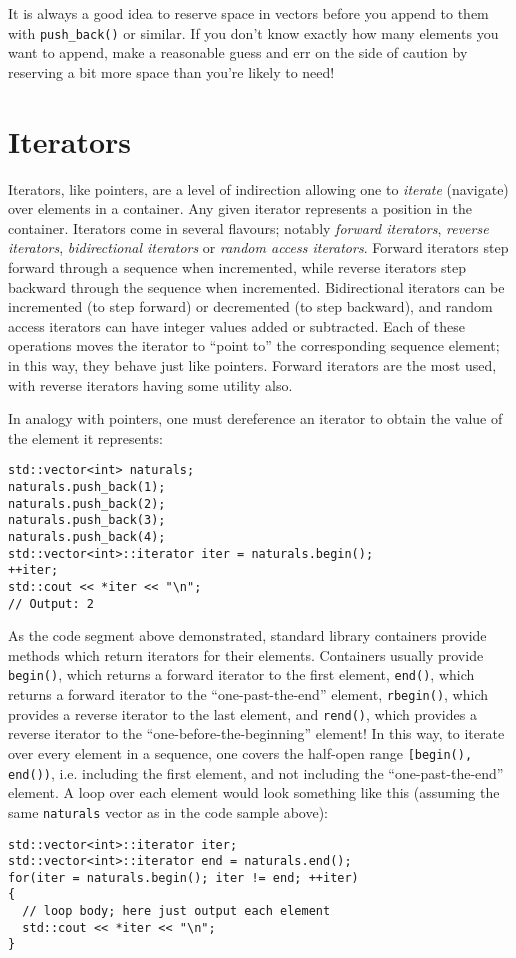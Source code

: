 \documentclass[a4paper]{scrartcl}
\begin{document}
It is always a good idea to reserve space in vectors before you append to them with \verb|push_back()| or similar. If you don't know exactly how many elements you want to append, make a reasonable guess and err on the side of caution by reserving a bit more space than you're likely to need!

\section{Iterators}\label{sec:iter}
Iterators, like pointers, are a level of indirection allowing one to \emph{iterate} (navigate) over elements in a container. Any given iterator represents a position in the container. Iterators come in several flavours; notably \emph{forward iterators}, \emph{reverse iterators}, \emph{bidirectional iterators} or \emph{random access iterators}. Forward iterators step forward through a sequence when incremented, while reverse iterators step backward through the sequence when incremented. Bidirectional iterators can be incremented (to step forward) or decremented (to step backward), and random access iterators can have integer values added or subtracted. Each of these operations moves the iterator to ``point to'' the corresponding sequence element; in this way, they behave just like pointers. Forward iterators are the most used, with reverse iterators having some utility also.

In analogy with pointers, one must dereference an iterator to obtain the value of the element it represents:
\begin{verbatim}
std::vector<int> naturals;
naturals.push_back(1);
naturals.push_back(2);
naturals.push_back(3);
naturals.push_back(4);
std::vector<int>::iterator iter = naturals.begin();
++iter;
std::cout << *iter << "\n";
// Output: 2
\end{verbatim}

As the code segment above demonstrated, standard library containers provide methods which return iterators for their elements. Containers usually provide \verb|begin()|, which returns a forward iterator to the first element, \verb|end()|, which returns a forward iterator to the ``one-past-the-end'' element, \verb|rbegin()|, which provides a reverse iterator to the last element, and \verb|rend()|, which provides a reverse iterator to the ``one-before-the-beginning'' element! In this way, to iterate over every element in a sequence, one covers the half-open range \verb|[begin(), end())|, i.e. including the first element, and not including the ``one-past-the-end'' element. A loop over each element would look something like this (assuming the same \verb|naturals| vector as in the code sample above):
\begin{verbatim}
std::vector<int>::iterator iter;
std::vector<int>::iterator end = naturals.end();
for(iter = naturals.begin(); iter != end; ++iter)
{
  // loop body; here just output each element
  std::cout << *iter << "\n";
}
\end{verbatim}
\end{document}
